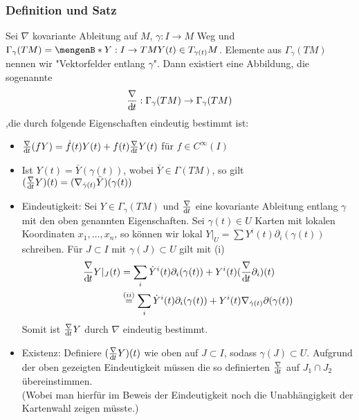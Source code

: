 \subsubsection[Definition: kovariante Ableitung entlang $gamma$]{Definition und Satz}
\label{ssub:211}
Sei $\nabla$ kovariante Ableitung auf $M$, $\gamma:I\to M$ Weg und $\Gamma_\gamma(TM) = \set[Y:I\to TM]{Y(t)\in T_{\gamma(t)} M}$. Elemente aus $\Gamma_\gamma(TM)$ nennen wir "Vektorfelder entlang $\gamma$". Dann existiert eine Abbildung, die sogenannte  
\[
\frac{\nabla}{\mathrm{d}\mkern-1.0mu t}:\Gamma_\gamma(TM) \to \Gamma_\gamma(TM)
\]
,die durch folgende Eigenschaften eindeutig bestimmt ist:
\begin{itemize}[(i)]
\item $\frac{\nabla}{\mathrm{d}\mkern-1.0mu t}(f Y) = \dot{f}(t)Y(t) + f(t)\frac{\nabla}{\mathrm{d}\mkern-1.0mu t} Y(t)$ für $f\in C^\infty(I)$
\item Ist $Y(t) = \bar{Y}(\gamma(t))$, wobei $\bar{Y} \in \Gamma(TM)$, so gilt $(\frac{\nabla}{\mathrm{d}\mkern-1.0mu t} Y)(t) = (\nabla_{\dot{\gamma}(t)} \bar{Y})(\gamma(t))$
\end{itemize}
\begin{itemize}[(a)]
\item Eindeutigkeit: Sei $Y \in \Gamma_\gamma(TM)$ und $\frac{\nabla}{\mathrm{d}\mkern-1.0mu t}$ eine kovariante Ableitung entlang $\gamma$ mit den oben genannten Eigenschaften. Sei $\gamma(t) \in U$ Karten mit lokalen Koordinaten $x_1,\ldots,x_n$, so können wir lokal $Y\vert_U = \sum Y^i (t) \partial_i (\gamma(t))$ schreiben. Für $J\subset I$ mit $\gamma(J) \subset U$ gilt mit (i)
\begin{align*}
	\frac{\nabla}{\mathrm{d}\mkern-1.0mu t} Y\vert_J (t) &= \sum_i \dot{Y}^i(t)\partial_i(\gamma(t)) + Y^i(t) (\frac{\nabla}{\mathrm{d}\mkern-1.0mu t} \partial_i)(t)\\
	& \overset{(ii)}{=} \sum_i \dot{Y}^i(t)\partial_i(\gamma(t)) + Y^i(t) \nabla_{\dot{\gamma}(t)} \partial(\gamma(t))
\end{align*}
Somit ist $\frac{\nabla}{\mathrm{d}\mkern-1.0mu t} Y$ durch $\nabla$ eindeutig bestimmt.
\item Existenz: Definiere $(\frac{\nabla}{\mathrm{d}\mkern-1.0mu t} Y)(t)$ wie oben auf $J\subset I$, sodass $\gamma(J) \subset U$. Aufgrund der oben gezeigten Eindeutigkeit müssen die so definierten $\frac{\nabla}{\mathrm{d}\mkern-1.0mu t}$ auf $J_1\cap J_2$ übereinstimmen.\\
(Wobei man hierfür im Beweis der Eindeutigkeit noch die Unabhängigkeit der Kartenwahl zeigen müsste.)
\end{itemize}

